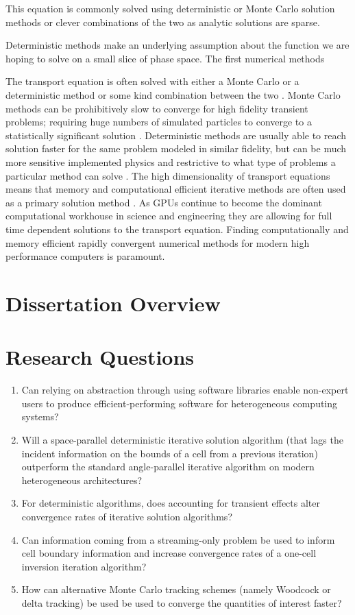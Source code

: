 This equation is commonly solved using deterministic or Monte Carlo \cite{lu} solution methods or clever combinations of the two \cite{monke_phd, pasmann_phd} as analytic solutions are sparse.

Deterministic methods make an underlying assumption about the function we are hoping to solve on a small slice of phase space.
The first numerical methods


The transport equation is often solved with either a Monte Carlo or a deterministic method or some kind combination between the two \cite{lewis1984computational}.
Monte Carlo methods can be prohibitively slow to converge for high fidelity transient problems; requiring huge numbers of simulated particles to converge to a statistically significant solution \cite{lux_1998}.
Deterministic methods are usually able to reach solution faster for the same problem modeled in similar fidelity, but can be much more sensitive implemented physics and restrictive to what type of problems a particular method can solve \cite{lewis1984computational}. 
The high dimensionality of transport equations means that memory and computational efficient iterative methods are often used as a primary solution method \cite{adams_fast_2002}.
As GPUs continue to become the dominant computational workhouse in science and engineering they are allowing for full time dependent solutions to the transport equation.
Finding computationally and memory efficient rapidly convergent numerical methods for modern high performance computers is paramount.



\section{Dissertation Overview}



\section{Research Questions}

\begin{enumerate}
    \item Can relying on abstraction through using software libraries enable non-expert users to produce efficient-performing software for heterogeneous computing systems?
    \item Will a space-parallel deterministic iterative solution algorithm (that lags the incident information on the bounds of a cell from a previous iteration) outperform the standard angle-parallel iterative algorithm on modern heterogeneous architectures?
    \item For deterministic algorithms, does accounting for transient effects alter convergence rates of iterative solution algorithms?
    \item Can information coming from a streaming-only problem be used to inform cell boundary information and increase convergence rates of a one-cell inversion iteration algorithm?
    \item How can alternative Monte Carlo tracking schemes (namely Woodcock or delta tracking) be used be used to converge the quantities of interest faster?
\end{enumerate}